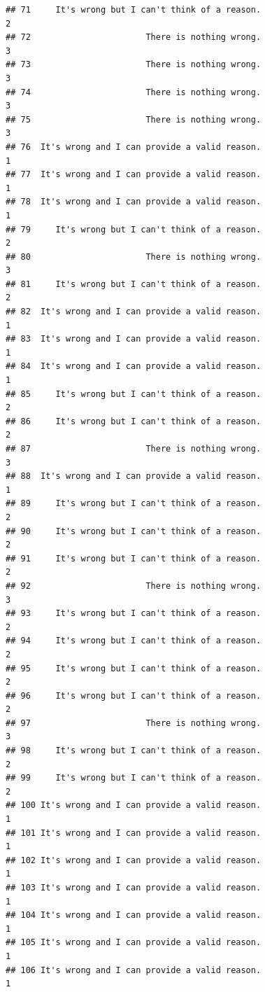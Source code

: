 \documentclass[
  american,
  man,floatsintext]{apa7}
\begin{document}
\begin{verbatim}
## 71     It's wrong but I can't think of a reason.                    2
## 72                       There is nothing wrong.                    3
## 73                       There is nothing wrong.                    3
## 74                       There is nothing wrong.                    3
## 75                       There is nothing wrong.                    3
## 76  It's wrong and I can provide a valid reason.                    1
## 77  It's wrong and I can provide a valid reason.                    1
## 78  It's wrong and I can provide a valid reason.                    1
## 79     It's wrong but I can't think of a reason.                    2
## 80                       There is nothing wrong.                    3
## 81     It's wrong but I can't think of a reason.                    2
## 82  It's wrong and I can provide a valid reason.                    1
## 83  It's wrong and I can provide a valid reason.                    1
## 84  It's wrong and I can provide a valid reason.                    1
## 85     It's wrong but I can't think of a reason.                    2
## 86     It's wrong but I can't think of a reason.                    2
## 87                       There is nothing wrong.                    3
## 88  It's wrong and I can provide a valid reason.                    1
## 89     It's wrong but I can't think of a reason.                    2
## 90     It's wrong but I can't think of a reason.                    2
## 91     It's wrong but I can't think of a reason.                    2
## 92                       There is nothing wrong.                    3
## 93     It's wrong but I can't think of a reason.                    2
## 94     It's wrong but I can't think of a reason.                    2
## 95     It's wrong but I can't think of a reason.                    2
## 96     It's wrong but I can't think of a reason.                    2
## 97                       There is nothing wrong.                    3
## 98     It's wrong but I can't think of a reason.                    2
## 99     It's wrong but I can't think of a reason.                    2
## 100 It's wrong and I can provide a valid reason.                    1
## 101 It's wrong and I can provide a valid reason.                    1
## 102 It's wrong and I can provide a valid reason.                    1
## 103 It's wrong and I can provide a valid reason.                    1
## 104 It's wrong and I can provide a valid reason.                    1
## 105 It's wrong and I can provide a valid reason.                    1
## 106 It's wrong and I can provide a valid reason.                    1

\end{verbatim}
\end{document}
